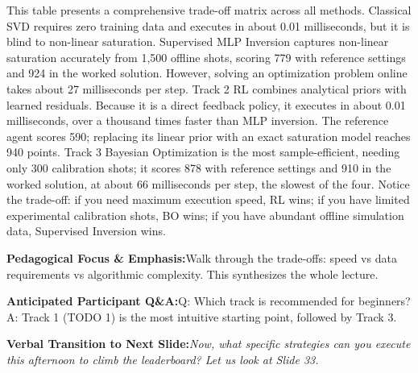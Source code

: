 \documentclass[11pt,a4paper]{article}
\begin{document}
\begin{tcolorbox}[colback=white,colframe=primaryblue,title={\footnotesize\bfseries\color{white}Spoken Presenter Script},fontupper=\small,left=6pt,right=6pt,top=3pt,bottom=3pt,boxrule=0.8pt,arc=2.5pt]
This table presents a comprehensive trade-off matrix across all methods. Classical SVD requires zero training data and executes in about 0.01 milliseconds, but it is blind to non-linear saturation. Supervised MLP Inversion captures non-linear saturation accurately from 1,500 offline shots, scoring 779 with reference settings and 924 in the worked solution. However, solving an optimization problem online takes about 27 milliseconds per step. Track 2 RL combines analytical priors with learned residuals. Because it is a direct feedback policy, it executes in about 0.01 milliseconds, over a thousand times faster than MLP inversion. The reference agent scores 590; replacing its linear prior with an exact saturation model reaches 940 points. Track 3 Bayesian Optimization is the most sample-efficient, needing only 300 calibration shots; it scores 878 with reference settings and 910 in the worked solution, at about 66 milliseconds per step, the slowest of the four. Notice the trade-off: if you need maximum execution speed, RL wins; if you have limited experimental calibration shots, BO wins; if you have abundant offline simulation data, Supervised Inversion wins.
\end{tcolorbox}
\vspace{0.2em}
\begin{tcolorbox}[colback=lightbg,colframe=bordergray,left=6pt,right=6pt,top=3pt,bottom=3pt,boxrule=0.6pt,arc=2.5pt]
\small
\noindent\textbf{\color{navy}Pedagogical Focus \& Emphasis:}\enspace Walk through the trade-offs: speed vs data requirements vs algorithmic complexity. This synthesizes the whole lecture.\par\vspace{0.3em}
\noindent\textbf{\color{successgreen}Anticipated Participant Q\&A:}\enspace Q: Which track is recommended for beginners? A: Track 1 (TODO 1) is the most intuitive starting point, followed by Track 3.\par\vspace{0.3em}
\noindent\textbf{\color{accent}Verbal Transition to Next Slide:}\enspace \emph{Now, what specific strategies can you execute this afternoon to climb the leaderboard? Let us look at Slide 33.}
\end{tcolorbox}
\clearpage
\hypertarget{slide.33}{}
{}
\end{document}
